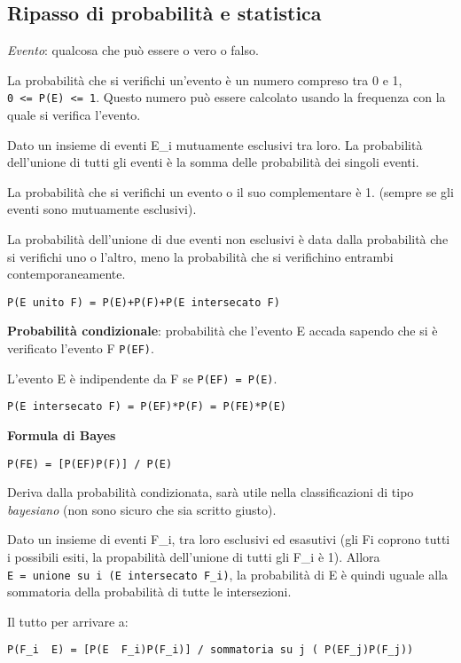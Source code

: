 \subsection{Ripasso di probabilità e statistica}\label{ripasso-di-probabilituxe0-e-statistica}
\emph{Evento}: qualcosa che può essere o vero o falso.

La probabilità che si verifichi un'evento è un numero compreso tra 0 e
1, \texttt{0\ \textless{}=\ P(E)\ \textless{}=\ 1}. Questo numero può
essere calcolato usando la frequenza con la quale si verifica l'evento.

Dato un insieme di eventi E\_i mutuamente esclusivi tra loro. La
probabilità dell'unione di tutti gli eventi è la somma delle probabilità
dei singoli eventi.

La probabilità che si verifichi un evento o il suo complementare è 1.
(sempre se gli eventi sono mutuamente esclusivi).

La probabilità dell'unione di due eventi non esclusivi è data dalla
probabilità che si verifichi uno o l'altro, meno la probabilità che si
verifichino entrambi contemporaneamente.

\texttt{P(E\ unito\ F)\ =\ P(E)+P(F)+P(E\ intersecato\ F)}

\textbf{Probabilità condizionale}: probabilità che l'evento E accada
sapendo che si è verificato l'evento F \texttt{P(E\textbar{}F)}.

L'evento E è indipendente da F se \texttt{P(E\textbar{}F)\ =\ P(E)}.

\texttt{P(E\ intersecato\ F)\ =\ P(E\textbar{}F)*P(F)\ =\ P(F\textbar{}E)*P(E)}

\textbf{Formula di Bayes}

\texttt{P(F\textbar{}E)\ =\ {[}P(E\textbar{}F)P(F){]}\ /\ P(E)}

Deriva dalla probabilità condizionata, sarà utile nella classificazioni
di tipo \emph{bayesiano} (non sono sicuro che sia scritto giusto).

Dato un insieme di eventi F\_i, tra loro esclusivi ed esasutivi (gli Fi
coprono tutti i possibili esiti, la propabilità dell'unione di tutti gli
F\_i è 1). Allora \texttt{E\ =\ unione\ su\ i\ (E\ intersecato\ F\_i)},
la probabilità di E è quindi uguale alla sommatoria della probabilità di
tutte le intersezioni.

Il tutto per arrivare a:

\texttt{P(F\_i\ \textbar{}\ E)\ =\ {[}P(E\ \textbar{}\ F\_i)P(F\_i){]}\ /\ sommatoria\ su\ j\ (\ P(E\textbar{}F\_j)P(F\_j))}

